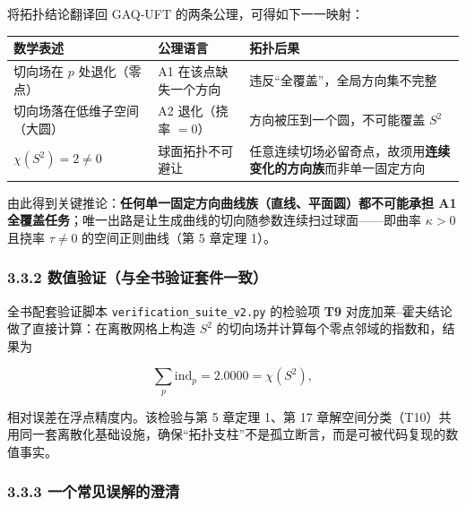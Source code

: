 将拓扑结论翻译回 GAQ‑UFT 的两条公理，可得如下一一映射：

\begin{longtable}[]{@{}
  >{\raggedright\arraybackslash}p{}
  >{\raggedright\arraybackslash}p{}
  >{\raggedright\arraybackslash}p{}@{}}
\toprule\noalign{}
\begin{minipage}[b]{\linewidth}\raggedright
数学表述
\end{minipage} & \begin{minipage}[b]{\linewidth}\raggedright
公理语言
\end{minipage} & \begin{minipage}[b]{\linewidth}\raggedright
拓扑后果
\end{minipage} \\
\midrule\noalign{}
\endhead
\bottomrule\noalign{}
\endlastfoot
切向场在 \(p\) 处退化（零点） & A1 在该点缺失一个方向 &
违反``全覆盖''，全局方向集不完整 \\
切向场落在低维子空间（大圆） & A2 退化（挠率 \(=0\)） &
方向被压到一个圆，不可能覆盖 \(S^2\) \\
\(\chi(S^2)=2\neq0\) & 球面拓扑不可避让 &
任意连续切场必留奇点，故须用\textbf{连续变化的方向族}而非单一固定方向 \\
\end{longtable}

由此得到关键推论：\textbf{任何单一固定方向曲线族（直线、平面圆）都不可能承担
A1 全覆盖任务}；唯一出路是让生成曲线的切向随参数连续扫过球面------即曲率
\(\kappa>0\) 且挠率 \(\tau\neq0\) 的空间正则曲线（第 5 章定理 1）。

\subsubsection{3.3.2
数值验证（与全书验证套件一致）}\label{ux6570ux503cux9a8cux8bc1ux4e0eux5168ux4e66ux9a8cux8bc1ux5957ux4ef6ux4e00ux81f4-1}

全书配套验证脚本 \texttt{verification\_suite\_v2.py} 的检验项
\textbf{T9} 对庞加莱--霍夫结论做了直接计算：在离散网格上构造 \(S^2\)
的切向场并计算每个零点邻域的指数和，结果为

\[
\sum_p \mathrm{ind}_p = 2.0000 = \chi(S^2),
\]

相对误差在浮点精度内。该检验与第 5 章定理 1、第 17
章解空间分类（T10）共用同一套离散化基础设施，确保``拓扑支柱''不是孤立断言，而是可被代码复现的数值事实。

\subsubsection{3.3.3
一个常见误解的澄清}\label{ux4e00ux4e2aux5e38ux89c1ux8befux89e3ux7684ux6f84ux6e05}

